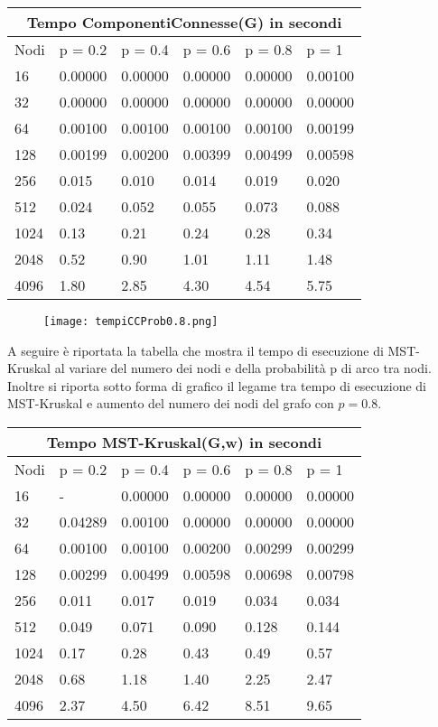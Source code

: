 \documentclass{article}
\begin{document}
\begin{tabular}{ |p{1.5cm}|p{1.5cm}|p{1.5cm}|p{1.5cm}|p{1.5cm}|p{1.5cm}| }
 \hline
 \multicolumn{6}{|c|}{Tempo ComponentiConnesse(G) in secondi} \\
 \hline
    Nodi & p = 0.2 & p = 0.4 & p = 0.6 & p = 0.8 & p = 1 \\
 \hline
    16 & 0.00000 & 0.00000 & 0.00000 & 0.00000 & 0.00100 \\
    32 & 0.00000 & 0.00000 & 0.00000  & 0.00000 & 0.00000 \\
    64 & 0.00100 & 0.00100 & 0.00100 & 0.00100 & 0.00199 \\
    128 & 0.00199 & 0.00200 & 0.00399 & 0.00499 & 0.00598 \\
    256 & 0.015 & 0.010 & 0.014 & 0.019 & 0.020 \\
    512 & 0.024 & 0.052 & 0.055 & 0.073 & 0.088 \\
    1024 & 0.13 & 0.21 & 0.24 & 0.28 & 0.34\\ 
    2048 & 0.52 & 0.90 & 1.01 & 1.11 & 1.48\\
    4096 & 1.80 & 2.85 & 4.30 & 4.54 & 5.75\\
 \hline
\end{tabular}

 \begin{figure}[h]
     \centering
     \texttt{[image: tempiCCProb0.8.png]}
     \label{fig:tempiCC08}
 \end{figure}
\pagebreak[4]
A seguire è riportata la tabella che mostra il tempo di esecuzione di MST-Kruskal al variare del numero dei nodi e della probabilità p di arco tra nodi. Inoltre si riporta sotto forma di grafico il legame tra tempo di esecuzione di MST-Kruskal e aumento del numero dei nodi del grafo con $p = 0.8$.

\medskip
\medskip

\begin{tabular}{ |p{1.5cm}|p{1.5cm}|p{1.5cm}|p{1.5cm}|p{1.5cm}|p{1.5cm}| }
 \hline
 \multicolumn{6}{|c|}{Tempo MST-Kruskal(G,w) in secondi} \\
 \hline
    Nodi & p = 0.2 & p = 0.4 & p = 0.6 & p = 0.8 & p = 1 \\
 \hline
    16 & - & 0.00000 & 0.00000 & 0.00000 & 0.00000 \\
    32 & 0.04289 & 0.00100 & 0.00000  & 0.00000 & 0.00000 \\
    64 & 0.00100 & 0.00100 & 0.00200 & 0.00299 & 0.00299 \\
    128 & 0.00299 & 0.00499 & 0.00598 & 0.00698 & 0.00798 \\
    256 & 0.011 & 0.017 & 0.019 & 0.034 & 0.034 \\
    512 & 0.049 & 0.071 & 0.090 & 0.128 & 0.144 \\
    1024 & 0.17 & 0.28 & 0.43 & 0.49 & 0.57\\ 
    2048 & 0.68 & 1.18 & 1.40 & 2.25 & 2.47\\
    4096 & 2.37 & 4.50 & 6.42 & 8.51 & 9.65\\
 \hline
\end{tabular}
\end{document}
